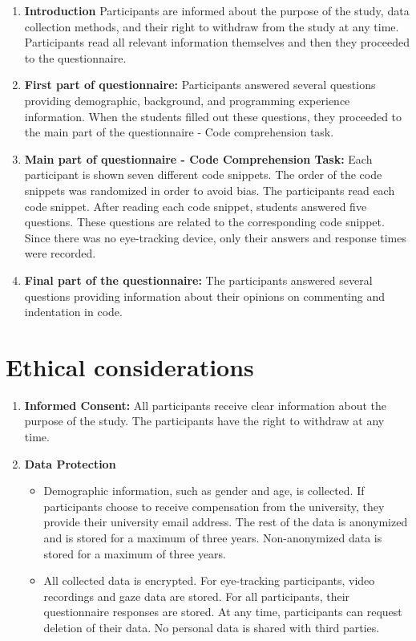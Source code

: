 \begin{enumerate}
    \item \textbf{Introduction} Participants are informed about the purpose of the study, data collection methods, and their right to withdraw from the study at any time. Participants read all relevant information themselves and then they proceeded to the questionnaire.
    
    \item \textbf{First part of questionnaire:}
    Participants answered several questions providing demographic, background, and programming experience information. When the students filled out these questions, they proceeded to the main part of the questionnaire - Code comprehension task.

    \item \textbf{Main part of questionnaire - Code Comprehension Task:} Each participant is shown seven different code snippets. The order of the code snippets was randomized in order to avoid bias. The participants read each code snippet. After reading each code snippet, students answered five questions. These questions are related to the corresponding code snippet. Since there was no eye-tracking device, only their answers and response times were recorded.

    \item \textbf{Final part of the questionnaire:}
    The participants answered several questions providing information about their opinions on commenting and indentation in code.
\end{enumerate}




\section{Ethical considerations}

\begin{enumerate}
    \item \textbf{Informed Consent: }All participants receive clear information about the purpose of the study. The participants have the right to withdraw at any time.
    
    \item \textbf{Data Protection}
    \begin{itemize}
        \item Demographic information, such as gender and age, is collected. If participants choose to receive compensation from the university, they provide their university email address. The rest of the data is anonymized and is stored for a maximum of three years. Non-anonymized data is stored for a maximum of three years.
        \item All collected data is encrypted. For eye-tracking participants, video recordings and gaze data are stored. For all participants, their questionnaire responses are stored. At any time, participants can request deletion of their data. No personal data is shared with third parties.
    \end{itemize}
\end{enumerate}

